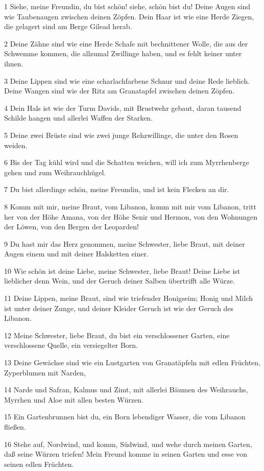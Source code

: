 \par 1 Siehe, meine Freundin, du bist schön! siehe, schön bist du! Deine Augen sind wie Taubenaugen zwischen deinen Zöpfen. Dein Haar ist wie eine Herde Ziegen, die gelagert sind am Berge Gilead herab.
\par 2 Deine Zähne sind wie eine Herde Schafe mit bechnittener Wolle, die aus der Schwemme kommen, die allzumal Zwillinge haben, und es fehlt keiner unter ihnen.
\par 3 Deine Lippen sind wie eine scharlachfarbene Schnur und deine Rede lieblich. Deine Wangen sind wie der Ritz am Granatapfel zwischen deinen Zöpfen.
\par 4 Dein Hals ist wie der Turm Davids, mit Brustwehr gebaut, daran tausend Schilde hangen und allerlei Waffen der Starken.
\par 5 Deine zwei Brüste sind wie zwei junge Rehzwillinge, die unter den Rosen weiden.
\par 6 Bis der Tag kühl wird und die Schatten weichen, will ich zum Myrrhenberge gehen und zum Weihrauchhügel.
\par 7 Du bist allerdinge schön, meine Freundin, und ist kein Flecken an dir.
\par 8 Komm mit mir, meine Braut, vom Libanon, komm mit mir vom Libanon, tritt her von der Höhe Amana, von der Höhe Senir und Hermon, von den Wohnungen der Löwen, von den Bergen der Leoparden!
\par 9 Du hast mir das Herz genommen, meine Schwester, liebe Braut, mit deiner Augen einem und mit deiner Halsketten einer.
\par 10 Wie schön ist deine Liebe, meine Schwester, liebe Braut! Deine Liebe ist lieblicher denn Wein, und der Geruch deiner Salben übertrifft alle Würze.
\par 11 Deine Lippen, meine Braut, sind wie triefender Honigseim; Honig und Milch ist unter deiner Zunge, und deiner Kleider Geruch ist wie der Geruch des Libanon.
\par 12 Meine Schwester, liebe Braut, du bist ein verschlossener Garten, eine verschlossene Quelle, ein versiegelter Born.
\par 13 Deine Gewächse sind wie ein Lustgarten von Granatäpfeln mit edlen Früchten, Zyperblumen mit Narden,
\par 14 Narde und Safran, Kalmus und Zimt, mit allerlei Bäumen des Weihrauchs, Myrrhen und Aloe mit allen besten Würzen.
\par 15 Ein Gartenbrunnen bist du, ein Born lebendiger Wasser, die vom Libanon fließen.
\par 16 Stehe auf, Nordwind, und komm, Südwind, und wehe durch meinen Garten, daß seine Würzen triefen! Mein Freund komme in seinen Garten und esse von seinen edlen Früchten.

